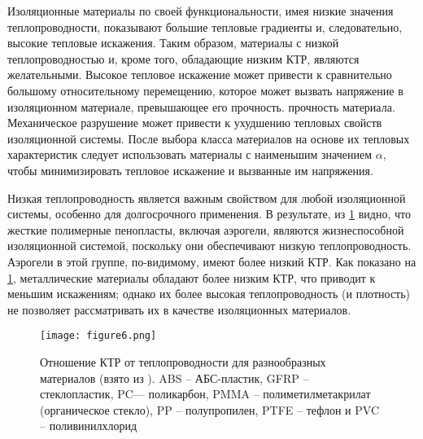 Изоляционные материалы по своей функциональности, имея низкие значения теплопроводности, показывают большие тепловые градиенты и, следовательно, высокие тепловые искажения.  Таким образом, материалы с низкой теплопроводностью и, кроме того, обладающие низким КТР, являются желательными. Высокое тепловое искажение может привести к сравнительно большому относительному перемещению, которое может вызвать напряжение в изоляционном материале, превышающее его прочность. прочность материала. Механическое разрушение может привести к ухудшению тепловых свойств изоляционной системы. После выбора класса материалов на основе их тепловых характеристик следует использовать материалы с наименьшим значением \(\alpha\), чтобы минимизировать тепловое искажение и вызванные им напряжения.

Низкая теплопроводность является важным свойством для любой изоляционной системы, особенно для долгосрочного применения. В результате, из \cref{fig:figure6} видно, что жесткие полимерные пенопласты, включая аэрогели, являются жизнеспособной изоляционной системой, поскольку они обеспечивают низкую теплопроводность. Аэрогели в этой группе, по-видимому, имеют более низкий КТР. Как показано на \cref{fig:figure6}, металлические материалы обладают более низким КТР, что приводит к меньшим искажениям; однако их более высокая теплопроводность (и плотность) не позволяет рассматривать их в качестве изоляционных материалов.

\begin{figure}[h!]
\centering
\texttt{[image: figure6.png]}%
\caption{Отношение КТР от теплопроводности для разнообразных материалов  (взято из \cite{ashby2005}). ABS -- АБС-пластик, GFRP -- стеклопластик, PC--- поликарбон, PMMA -- полиметилметакрилат (органическое стекло), PP -- полупропилен, PTFE -- тефлон и PVC -- поливинилхлорид}
\label{fig:figure6}
\end{figure}